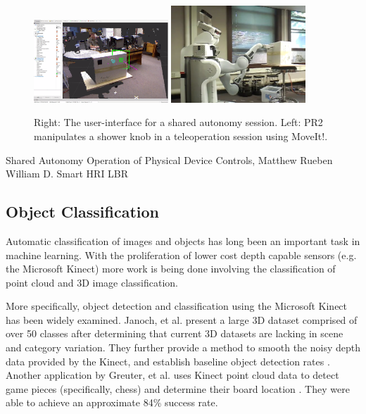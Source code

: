 \documentclass{article}
\begin{document}
\begin{figure}[h!]
    \centering
    \includegraphics[width=0.45\textwidth]{Shared_Autonomy_1.png}
    \includegraphics[width=0.45\textwidth]{Shared_Autonomy_2.png}
    \caption{Right: The user-interface for a shared autonomy session. Left: PR2 manipulates a shower knob in a teleoperation session using MoveIt!.}
    \label{fig:sharedAutonomy}
\end{figure}
Shared Autonomy Operation of Physical Device Controls, Matthew Rueben William D. Smart HRI LBR

\subsection{Object Classification}
Automatic classification of images and objects has long been an important task in machine learning. With the proliferation of lower cost depth capable sensors (e.g. the Microsoft Kinect) more work is being done involving the classification of point cloud and 3D image classification.

More specifically, object detection and classification using the Microsoft Kinect has been widely examined. Janoch, et al. present a large 3D dataset comprised of over 50 classes after determining that current 3D datasets are lacking in scene and category variation. They further provide a method to smooth the noisy depth data provided by the Kinect, and establish baseline object detection rates \cite{kinectWork}. Another application by Greuter, et al. uses Kinect point cloud data to detect game pieces (specifically, chess) and determine their board location \cite{eurobot}. They were able to achieve an approximate 84\% success rate.
\end{document}
